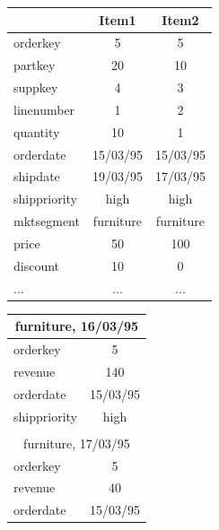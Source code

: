 \documentclass[sigplan,10pt]{acmart}
\begin{document}
\begin{table}
	\small
	\setlength\tabcolsep{5pt}
	\begin{minipage}{0.26\textwidth}
	\begin{tabular}{lcc}
		\multicolumn{1}{c}{}               & Item1                          & Item2                          \\ \hline
		orderkey     & 5         & 5         \\
		partkey      & 20        & 10        \\
		suppkey      & 4         & 3         \\
		linenumber   & 1         & 2         \\
		quantity     & 10        & 1         \\
		orderdate    & 15/03/95  & 15/03/95  \\
		shipdate     & 19/03/95  & 17/03/95  \\
		shippriority & high      & high      \\
		mktsegment   & furniture & furniture \\
		price        & 50        & 100       \\
		discount     & 10        & 0         \\
		...          & ...       & ...       \\ \hline
	\end{tabular}
		\vspace{1em}
		\label{table:new_lineitems}
	\end{minipage}
	\begin{minipage}{0.2\textwidth}
	\begin{tabular}{lc}
		\multicolumn{2}{c}{furniture, 16/03/95}                            \\ \hline
		orderkey     & 5        \\
		revenue      & 140      \\
		orderdate    & 15/03/95 \\
		shippriority & high     \\ \hline
		{} & {} \vspace*{-0.4em}    \\ 
		\multicolumn{2}{c}{furniture, 17/03/95}                            \\ \hline
		orderkey     & 5        \\
		revenue      & 40       \\
		orderdate    & 15/03/95 \\

\end{tabular}
\end{minipage}
\end{table}
\end{document}
